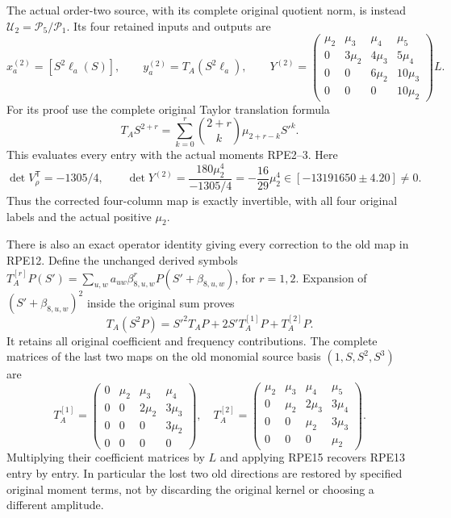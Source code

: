 \documentclass[11pt]{article}
\begin{document}
The actual order-two source, with its complete original quotient norm,
is instead $\mathcal U_2=\mathcal P_5/\mathcal P_1$.
Its four retained inputs and outputs are
\[
 x_a^{(2)}=[S^2\ell_a(S)],\qquad
 y_a^{(2)}=T_A(S^2\ell_a),\qquad
 Y^{(2)}=
 \begin{pmatrix}
 \mu_2&\mu_3&\mu_4&\mu_5\\
 0&3\mu_2&4\mu_3&5\mu_4\\
 0&0&6\mu_2&10\mu_3\\
 0&0&0&10\mu_2
 \end{pmatrix}L.
 \tag{RPE13}
\]
For its proof use the complete original Taylor translation formula
\[T_AS^{2+r}=\sum_{k=0}^r\binom{2+r}{k}\mu_{2+r-k}S'^k.\]
This evaluates every entry with the actual moments RPE2--3.
Here
\[
 \det V_\rho^{\mathsf T}=-1305/4,\qquad
 \det Y^{(2)}=\frac{180\mu_2^4}{-1305/4}
       =-\frac{16}{29}\mu_2^4
       \in[-13191650\mathbin\pm4.20]\ne0.
 \tag{RPE14}
\]
Thus the corrected four-column map is exactly invertible, with all
four original labels and the actual positive $\mu_2$.

There is also an exact operator identity giving every correction to
the old map in RPE12. Define the unchanged derived symbols
$T_A^{[r]}P(S')=\sum_{u,w}a_{uw}\beta_{8,u,w}^{r}
P(S'+\beta_{8,u,w})$, for $r=1,2$.
Expansion of $(S'+\beta_{8,u,w})^2$ inside the original sum proves
\[
 T_A(S^2P)=S'^2T_AP+2S'T_A^{[1]}P+T_A^{[2]}P.
 \tag{RPE15}
\]
It retains all original coefficient and frequency contributions.
The complete matrices of the last two maps on the old monomial
source basis $(1,S,S^2,S^3)$ are
\[
 T_A^{[1]}=
 \begin{pmatrix}0&\mu_2&\mu_3&\mu_4\\
 0&0&2\mu_2&3\mu_3\\0&0&0&3\mu_2\\0&0&0&0\end{pmatrix},
 \quad
 T_A^{[2]}=
 \begin{pmatrix}\mu_2&\mu_3&\mu_4&\mu_5\\
 0&\mu_2&2\mu_3&3\mu_4\\0&0&\mu_2&3\mu_3\\0&0&0&\mu_2\end{pmatrix}.
 \tag{RPE16}
\]
Multiplying their coefficient matrices by $L$ and applying RPE15
recovers RPE13 entry by entry. In particular the lost two old
directions are restored by specified original moment terms, not by
discarding the original kernel or choosing a different amplitude.
\end{document}
